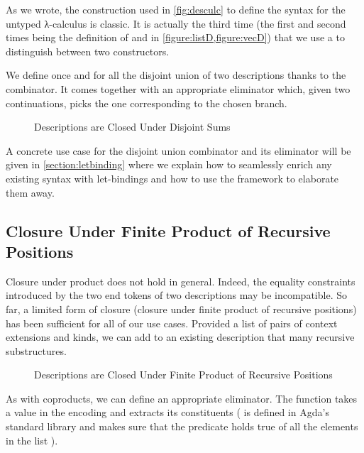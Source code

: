 As we wrote, the construction used in \cref{fig:desculc} to define the
syntax for the untyped λ-calculus is classic. It is actually the third
time (the first and second times being the definition of  and
 in \cref{figure:listD,figure:vecD}) that we use a 
to distinguish between two constructors.

We define once and for all the disjoint union of two descriptions thanks
to the  combinator. It comes together with an appropriate
eliminator  which, given two continuations, picks the one
corresponding to the chosen branch.

\begin{figure}[h]
\caption{Descriptions are Closed Under Disjoint Sums\label{figure:descsum}}
\end{figure}

A concrete use case for the disjoint union combinator and its eliminator
will be given in \cref{section:letbinding} where we explain how to seamlessly
enrich any existing syntax with let-bindings and how to use the 
framework to elaborate them away.

\subsection{Closure Under Finite Product of Recursive Positions}

Closure under product does not hold in general. Indeed, the equality constraints
introduced by the two end tokens of two descriptions may be incompatible. So far,
a limited form of closure (closure under finite product of recursive positions)
has been sufficient for all of our use cases. Provided a list of pairs of context
extensions and kinds, we can add to an existing description that many recursive
substructures.

\begin{figure}[h]
\caption{Descriptions are Closed Under Finite Product of Recursive Positions\label{figure:descprod}}
\end{figure}

As with coproducts, we can define an appropriate eliminator. The function 
takes a value in the encoding and extracts its constituents ({  }
is defined in Agda's standard library and makes sure that the predicate  holds
true of all the elements in the list ).

